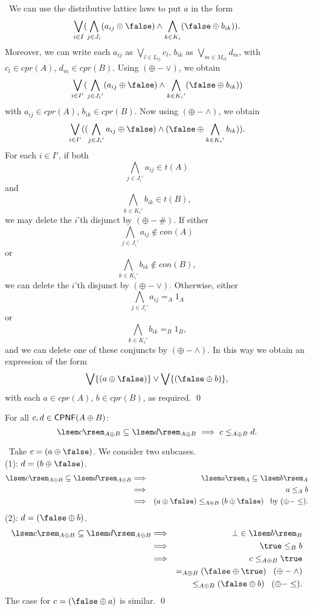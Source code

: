 \proof\ We can use the distributive lattice laws to put $a$ in the form
\[ \bigvee_{i \in I}(\bigwedge_{j \in J_{i}}(a_{ij} \oplus \false ) 
\wedge \bigwedge_{k \in K_{i}}(\false \oplus b_{ik})). \]
Moreover, we can write each $a_{ij}$ as $\bigvee_{l \in L_{ij}}c_{l}$, $b_{ik}$ as $\bigvee_{m \in M_{ik}}d_{m}$, with $c_{l} \in cpr(A)$, $d_{m} \in cpr(B)$. Using $(\oplus - \vee )$, we obtain
\[ \bigvee_{i \in I'}(\bigwedge_{j \in {J_{i}}'}(a_{ij} \oplus \false ) \wedge \bigwedge_{k \in {K_{i}}'}(\false \oplus b_{ik})) \]
with $a_{ij} \in cpr(A)$, $b_{ik} \in cpr(B)$. Now using $(\oplus - \wedge )$, we obtain
\[ \bigvee_{i \in I'}((\bigwedge_{j \in {J_{i}}'}a_{ij} \oplus \false ) \wedge (\false \oplus \bigwedge_{k \in {K_{i}}'} b_{ik})). \]
For each $i \in I'$, if both 
\[ \bigwedge_{j \in {J_{i}}'}a_{ij} \in t(A) \] 
and 
\[ \bigwedge_{k \in {K_{i}}'}b_{ik} \in t(B), \] 
we may delete the $i$'th disjunct by $(\oplus - \# )$. If either 
\[ \bigwedge_{j \in {J_{i}}'}a_{ij} \not\in con(A) \]
or 
\[ \bigwedge_{k \in {K_{i}}'}b_{ik} \not\in con(B), \] 
we can delete the $i$'th disjunct by $(\oplus - \vee )$. Otherwise, either 
\[ \bigwedge_{j \in {J_{i}}'}a_{ij} =_{A} 1_{A} \]
or 
\[ \bigwedge_{k \in {K_{i}}'}b_{ik} =_{B} 1_{B}, \] 
and we can delete one of these conjuncts by $(\oplus - \wedge )$. In this way we obtain an expression of the form
\[ \bigvee \{ (a \oplus \false ) \} \vee \bigvee \{ (\false \oplus b) \} , \]
with each $a \in cpr(A)$, $b \in cpr(B)$, as required. \qed

\begin{proposition}[T4]
For all $c, d \in {\sf CPNF}(A \oplus B)$:
\[ \lsem c \rsem_{A \oplus B} \subseteq \lsem d \rsem_{A \oplus B} \; \Longrightarrow \; c \leq_{A \oplus B} d. \]
\end{proposition}

\proof\ Take $c = (a \oplus \false )$. We consider two subcases. \\
(1): $d = (b \oplus \false )$.
\begin{eqnarray*}
\lsem c \rsem_{A \oplus B} \subseteq \lsem d \rsem_{A \oplus B} & \Longrightarrow  & \lsem a \rsem_{A} \subseteq \lsem b \rsem_{A} \\
& \Longrightarrow & a \leq_{A} b \\
& \Longrightarrow & (a \oplus \false ) \leq_{A \oplus B} (b \oplus \false ) \;\;\; {\rm by} \; (\oplus - \leq ). 
\end{eqnarray*} 
(2): $d = (\false \oplus b)$.
\begin{eqnarray*}
\lsem c \rsem_{A \oplus B} \subseteq \lsem d \rsem_{A \oplus B} & \Longrightarrow  & \bot \in \lsem b \rsem_{B} \\
& \Longrightarrow & \true \leq_{B} b \\
& \Longrightarrow & c \leq_{A \oplus B} \true \\
& &  =_{A \oplus B} (\false \oplus \true ) \;\;\; (\oplus - \wedge) \\
& &  \leq_{A \oplus B} (\false \oplus b) \;\;\; (\oplus - \leq ).
\end{eqnarray*} 
The case for $c = (\false \oplus a)$ is similar. \qed
